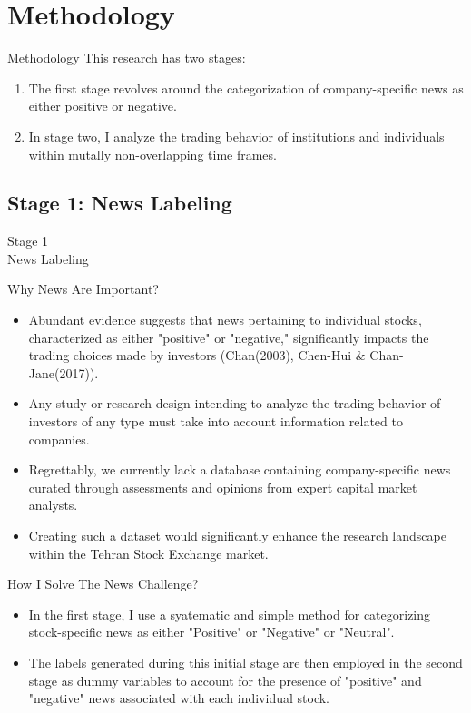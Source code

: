 \documentclass{beamer}
\begin{document}
\section{Methodology}


\begin{frame}{Methodology}
    This research has two stages:
    \begin{enumerate}
        \item The first stage revolves around the categorization of company-specific news as either positive or negative.
        \item In stage two, I analyze the trading behavior of institutions and individuals within mutally non-overlapping time frames.
    \end{enumerate}
\end{frame}


\subsection{Stage 1: News Labeling}


\begin{frame}
    \Huge
    \center
    Stage 1
    \\
    News Labeling
\end{frame}

\begin{frame}{Why News Are Important?}
    \begin{itemize}
        \item Abundant evidence suggests that news pertaining to individual stocks, characterized as either "positive" or "negative," significantly impacts the trading choices made by investors (Chan(2003), Chen-Hui \& Chan-Jane(2017)).
        \item Any study or research design intending to analyze the trading behavior of investors of any type must take into account information related to companies.
        \item Regrettably, we currently lack a database containing company-specific news curated through assessments and opinions from expert capital market analysts.
        \item Creating such a dataset would significantly enhance the research landscape within the Tehran Stock Exchange market.
    \end{itemize}
\end{frame}

\begin{frame}{How I Solve The News Challenge?}
    \begin{itemize}
        \item In the first stage, I use a syatematic and simple method for categorizing stock-specific news as either "Positive" or "Negative" or "Neutral".
        \item The labels generated during this initial stage are then employed in the second stage as dummy variables to account for the presence of "positive" and "negative" news associated with each individual stock.
    \end{itemize}
\end{frame}
\end{document}
